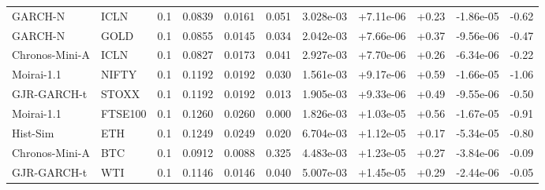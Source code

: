 \begin{tabular}{llrrrrrrrrr}
GARCH-N & ICLN & 0.1 & 0.0839 & 0.0161 & 0.051 & 3.028e-03 & +7.11e-06 & +0.23 & -1.86e-05 & -0.62 \\
GARCH-N & GOLD & 0.1 & 0.0855 & 0.0145 & 0.034 & 2.042e-03 & +7.66e-06 & +0.37 & -9.56e-06 & -0.47 \\
Chronos-Mini-A & ICLN & 0.1 & 0.0827 & 0.0173 & 0.041 & 2.927e-03 & +7.70e-06 & +0.26 & -6.34e-06 & -0.22 \\
Moirai-1.1 & NIFTY & 0.1 & 0.1192 & 0.0192 & 0.030 & 1.561e-03 & +9.17e-06 & +0.59 & -1.66e-05 & -1.06 \\
GJR-GARCH-t & STOXX & 0.1 & 0.1192 & 0.0192 & 0.013 & 1.905e-03 & +9.33e-06 & +0.49 & -9.55e-06 & -0.50 \\
Moirai-1.1 & FTSE100 & 0.1 & 0.1260 & 0.0260 & 0.000 & 1.826e-03 & +1.03e-05 & +0.56 & -1.67e-05 & -0.91 \\
Hist-Sim & ETH & 0.1 & 0.1249 & 0.0249 & 0.020 & 6.704e-03 & +1.12e-05 & +0.17 & -5.34e-05 & -0.80 \\
Chronos-Mini-A & BTC & 0.1 & 0.0912 & 0.0088 & 0.325 & 4.483e-03 & +1.23e-05 & +0.27 & -3.84e-06 & -0.09 \\
GJR-GARCH-t & WTI & 0.1 & 0.1146 & 0.0146 & 0.040 & 5.007e-03 & +1.45e-05 & +0.29 & -2.44e-06 & -0.05 \\
\bottomrule
\end{tabular}
